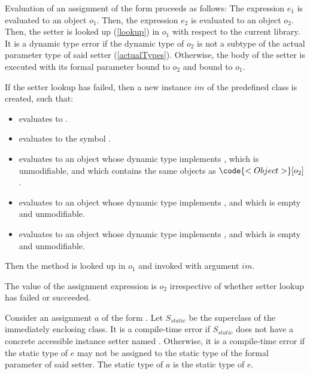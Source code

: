 \documentclass[makeidx]{article}
\begin{document}
{\LMHash{}%
Evaluation of an assignment of the form 
proceeds as follows:
The expression $e_1$ is evaluated to an object $o_1$.
Then, the expression $e_2$ is evaluated to an object $o_2$.
Then, the setter  is looked up (\ref{lookup})
in $o_1$ with respect to the current library.
It is a dynamic type error if the dynamic type of $o_2$
is not a subtype of the actual parameter type of said setter
(\ref{actualTypes}).
Otherwise, the body of the setter is executed with
its formal parameter bound to $o_2$ and \THIS{} bound to $o_1$.

\LMHash{}%
If the setter lookup has failed, then a new instance $im$ of
the predefined class  is created, such that:
\begin{itemize}
\item {} evaluates to \TRUE.
\item {} evaluates to the symbol .
\item {} evaluates to an object
  whose dynamic type implements ,
  which is unmodifiable, and which contains the same objects as
  $\code{<Object>}[o_2]$.
\item {} evaluates to an object
  whose dynamic type implements ,
  and which is empty and unmodifiable.
\item {} evaluates to an object
  whose dynamic type implements ,
  and which is empty and unmodifiable.
\end{itemize}

\LMHash{}%
Then the method  is looked up in $o_1$
and invoked with argument $im$.


\LMHash{}%
The value of the assignment expression is $o_2$
irrespective of whether setter lookup has failed or succeeded.
\EndCase

\LMHash{}%
Consider an assignment $a$ of the form .
Let $S_{static}$ be the superclass of the immediately enclosing class.
It is a compile-time error if $S_{static}$ does not have
a concrete accessible instance setter named .
Otherwise, it is a compile-time error if the static type of $e$
may not be assigned to the static type of the formal parameter of said setter.
The static type of $a$ is the static type of $e$.

}
\end{document}
